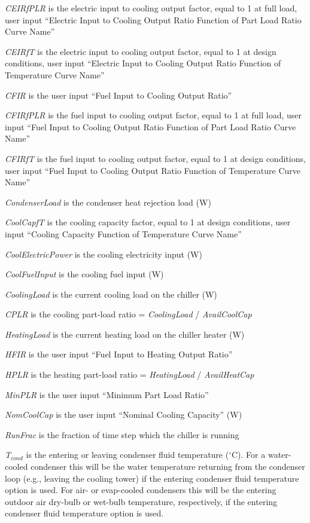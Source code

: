 \emph{CEIRfPLR} is the electric input to cooling output factor, equal to 1 at full load, user input ``Electric Input to Cooling Output Ratio Function of Part Load Ratio Curve Name''

\emph{CEIRfT} is the electric input to cooling output factor, equal to 1 at design conditions, user input ``Electric Input to Cooling Output Ratio Function of Temperature Curve Name''

\emph{CFIR} is the user input ``Fuel Input to Cooling Output Ratio''

\emph{CFIRfPLR} is the fuel input to cooling output factor, equal to 1 at full load, user input ``Fuel Input to Cooling Output Ratio Function of Part Load Ratio Curve Name''

\emph{CFIRfT} is the fuel input to cooling output factor, equal to 1 at design conditions, user input ``Fuel Input to Cooling Output Ratio Function of Temperature Curve Name''

\emph{CondenserLoad} is the condenser heat rejection load (W)

\emph{CoolCapfT} is the cooling capacity factor, equal to 1 at design conditions, user input ``Cooling Capacity Function of Temperature Curve Name''

\emph{CoolElectricPower} is the cooling electricity input (W)

\emph{CoolFuelInput} is the cooling fuel input (W)

\emph{CoolingLoad} is the current cooling load on the chiller (W)

\emph{CPLR} is the cooling part-load ratio = \emph{CoolingLoad} / \emph{AvailCoolCap}

\emph{HeatingLoad} is the current heating load on the chiller heater (W)

\emph{HFIR} is the user input ``Fuel Input to Heating Output Ratio''

\emph{HPLR} is the heating part-load ratio = \emph{HeatingLoad} / \emph{AvailHeatCap}

\emph{MinPLR} is the user input ``Minimum Part Load Ratio''

\emph{NomCoolCap} is the user input ``Nominal Cooling Capacity'' (W)

\emph{RunFrac} is the fraction of time step which the chiller is running

\emph{T\(_{cond}\)} is the entering or leaving condenser fluid temperature (\(^{\circ}\)C). For a water-cooled condenser this will be the water temperature returning from the condenser loop (e.g., leaving the cooling tower) if the entering condenser fluid temperature option is used. For air- or evap-cooled condensers this will be the entering outdoor air dry-bulb or wet-bulb temperature, respectively, if the entering condenser fluid temperature option is used.

